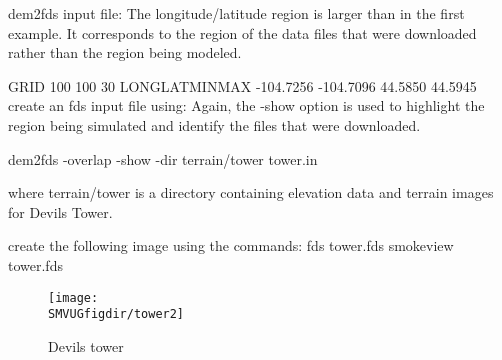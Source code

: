 dem2fds input file:
The longitude/latitude region is larger than in the first example.
It corresponds to the region of the data files that were downloaded rather than the region being modeled.

GRID
 100 100 30
LONGLATMINMAX
 -104.7256 -104.7096 44.5850 44.5945
create an fds input file using:
Again, the -show option is used to highlight the region being simulated and identify the files that were downloaded.

dem2fds -overlap -show -dir terrain/tower tower.in

where terrain/tower is a directory containing elevation data and terrain images for Devils Tower.

create the following image using the commands:
fds tower.fds
smokeview tower.fds

\begin{figure}[bph]
\centerline{
\texttt{[image: \\SMVUGfigdir/tower2]}}
 \caption[FDS file overview]{Devils tower }
\label{devilstowerB}%
\end{figure}

